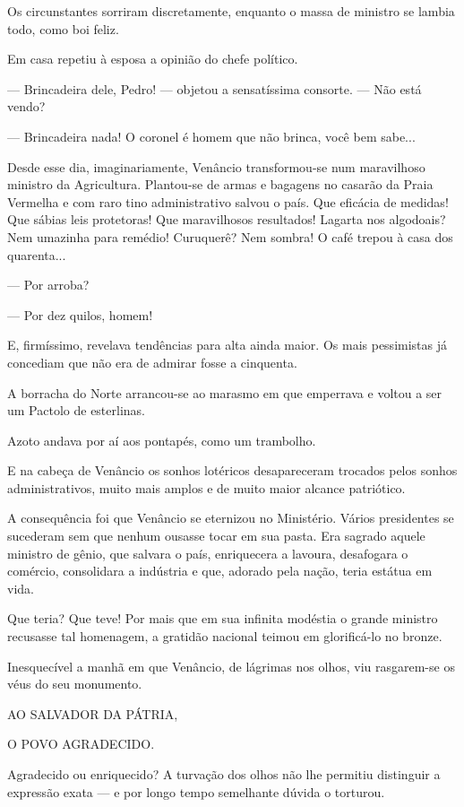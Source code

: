 Os circunstantes sorriram discretamente, enquanto o massa de ministro se
lambia todo, como boi feliz.

Em casa repetiu à esposa a opinião do chefe político.

--- Brincadeira dele, Pedro! --- objetou a sensatíssima consorte. ---
Não está vendo?

--- Brincadeira nada! O coronel é homem que não brinca, você bem sabe...

Desde esse dia, imaginariamente, Venâncio transformou-se num maravilhoso
ministro da Agricultura. Plantou-se de armas e bagagens no casarão da
Praia Vermelha e com raro tino administrativo salvou o país. Que
eficácia de medidas! Que sábias leis protetoras! Que maravilhosos
resultados! Lagarta nos algodoais? Nem umazinha para remédio! Curuquerê?
Nem sombra! O café trepou à casa dos quarenta...

--- Por arroba?

--- Por dez quilos, homem!

E, firmíssimo, revelava tendências para alta ainda maior. Os mais
pessimistas já concediam que não era de admirar fosse a cinquenta.

A borracha do Norte arrancou-se ao marasmo em que emperrava e voltou a
ser um Pactolo de esterlinas.

Azoto andava por aí aos pontapés, como um trambolho.

E na cabeça de Venâncio os sonhos lotéricos desapareceram trocados pelos
sonhos administrativos, muito mais amplos e de muito maior alcance
patriótico.

A consequência foi que Venâncio se eternizou no Ministério. Vários
presidentes se sucederam sem que nenhum ousasse tocar em sua pasta. Era
sagrado aquele ministro de gênio, que salvara o país, enriquecera a
lavoura, desafogara o comércio, consolidara a indústria e que, adorado
pela nação, teria estátua em vida.

Que teria? Que teve! Por mais que em sua infinita modéstia o grande
ministro recusasse tal homenagem, a gratidão nacional teimou em
glorificá-lo no bronze.

Inesquecível a manhã em que Venâncio, de lágrimas nos olhos, viu
rasgarem-se os véus do seu monumento.

AO SALVADOR DA PÁTRIA,

O POVO AGRADECIDO.

Agradecido ou enriquecido? A turvação dos olhos não lhe permitiu
distinguir a expressão exata --- e por longo tempo semelhante dúvida o
torturou.

